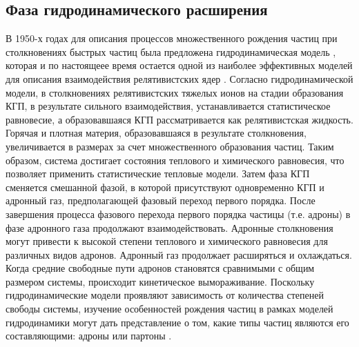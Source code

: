 \subsection{Фаза гидродинамического расширения} \label{ch1/hydro}
В 1950-х годах для описания процессов множественного рождения частиц при столкновениях быстрых частиц была предложена гидродинамическая модель \cite{HydroLandau}, которая и по настоящеее время остается одной из наиболее эффективных моделей для описания взаимодействия релятивистских ядер \cite{HydroPartonicCascade, Flow1, Flow2}.
Согласно гидродинамической модели, в столкновениях релятивистских тяжелых ионов на стадии образования КГП, в результате сильного взаимодействия, устанавливается статистическое равновесие, а образовавшаяся КГП рассматривается как релятивистская жидкость.
Горячая и плотная материя, образовавшаяся в результате столкновения, увеличивается в размерах за счет множественного образования частиц.
Таким образом, система достигает состояния теплового и химического равновесия, что позволяет применить статистические тепловые модели.
Затем фаза КГП сменяется смешанной фазой, в которой присутствуют одновременно КГП и адронный газ, предполагающей фазовый переход первого порядка. После завершения процесса фазового перехода первого порядка частицы (т.е. адроны) в фазе адронного газа продолжают взаимодействовать. Адронные столкновения могут привести к высокой степени теплового и химического равновесия для различных видов адронов. Адронный газ продолжает расширяться и охлаждаться. Когда средние свободные пути адронов становятся сравнимыми с общим размером системы, происходит кинетическое вымораживание.
Поскольку гидродинамические модели проявляют зависимость от количества степеней свободы системы, изучение особенностей рождения частиц в рамках моделей гидродинамики могут дать представление о том, какие типы частиц являются его составляющими: адроны или партоны \cite{Flow1, Flow2}.

